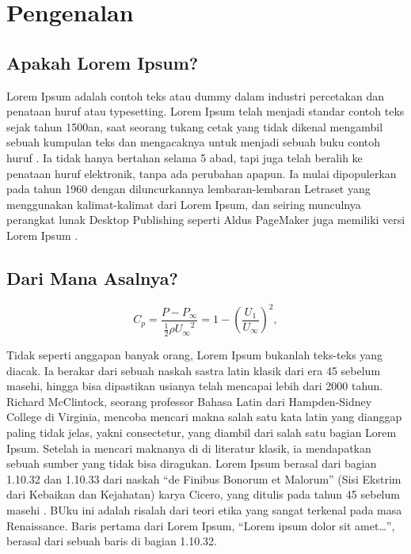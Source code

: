 \chapter{Pengenalan}
\label{bab:pengenalan}

\section{Apakah Lorem Ipsum?}
\label{sec:apadia}

Lorem Ipsum adalah contoh teks atau dummy dalam industri percetakan dan penataan huruf atau typesetting. Lorem Ipsum telah menjadi standar contoh teks sejak tahun 1500an, saat seorang tukang cetak yang tidak dikenal mengambil sebuah kumpulan teks dan mengacaknya untuk menjadi sebuah buku contoh huruf \cite{banerjee:pedersen:2003}. Ia tidak hanya bertahan selama 5 abad, tapi juga telah beralih ke penataan huruf elektronik, tanpa ada perubahan apapun. Ia mulai dipopulerkan pada tahun 1960 dengan diluncurkannya lembaran-lembaran Letraset yang menggunakan kalimat-kalimat dari Lorem Ipsum, dan seiring munculnya perangkat lunak Desktop Publishing seperti Aldus PageMaker juga memiliki versi Lorem Ipsum \cite{berment:phd:2004}.



\section{Dari Mana Asalnya?}
\label{sec:asal}

\begin{equation}
C_p = \frac{P - P_\infty}{\frac{1}{2} \rho {U_\infty}^2}
 = 1 - \left( \frac{U_1}{U_\infty} \right)^2,
\end{equation}

Tidak seperti anggapan banyak orang, Lorem Ipsum bukanlah teks-teks yang diacak. Ia berakar dari sebuah naskah sastra latin klasik dari era 45 sebelum masehi, hingga bisa dipastikan usianya telah mencapai lebih dari 2000 tahun. Richard McClintock, seorang professor Bahasa Latin dari Hampden-Sidney College di Virginia, mencoba mencari makna salah satu kata latin yang dianggap paling tidak jelas, yakni consectetur, yang diambil dari salah satu bagian Lorem Ipsum. Setelah ia mencari maknanya di di literatur klasik, ia mendapatkan sebuah sumber yang tidak bisa diragukan. Lorem Ipsum berasal dari bagian 1.10.32 dan 1.10.33 dari naskah ``de Finibus Bonorum et Malorum'' (Sisi Ekstrim dari Kebaikan dan Kejahatan) karya Cicero, yang ditulis pada tahun 45 sebelum masehi \cite{azarova:etal:2002,budanitsky:hirst:2006}. BUku ini adalah risalah dari teori etika yang sangat terkenal pada masa Renaissance. Baris pertama dari Lorem Ipsum, ``Lorem ipsum dolor sit amet\ldots'', berasal dari sebuah baris di bagian 1.10.32.

